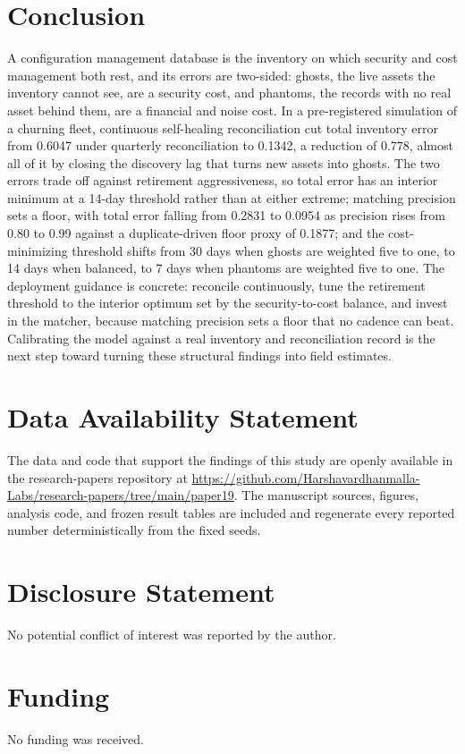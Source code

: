 \documentclass[journal]{IEEEtran}
\begin{document}
\section{Conclusion}
A configuration management database is the inventory on which security and cost management both rest,
and its errors are two-sided: ghosts, the live assets the inventory cannot see, are a security cost,
and phantoms, the records with no real asset behind them, are a financial and noise cost. In a
pre-registered simulation of a churning fleet, continuous self-healing reconciliation cut total
inventory error from 0.6047 under quarterly reconciliation to 0.1342, a reduction of 0.778, almost
all of it by closing the discovery lag that turns new assets into ghosts. The two errors trade off
against retirement aggressiveness, so total error has an interior minimum at a 14-day threshold rather
than at either extreme; matching precision sets a floor, with total error falling from 0.2831 to
0.0954 as precision rises from 0.80 to 0.99 against a duplicate-driven floor proxy of 0.1877; and the
cost-minimizing threshold shifts from 30 days when ghosts are weighted five to one, to 14 days when
balanced, to 7 days when phantoms are weighted five to one. The deployment guidance is concrete:
reconcile continuously, tune the retirement threshold to the interior optimum set by the
security-to-cost balance, and invest in the matcher, because matching precision sets a floor that no
cadence can beat. Calibrating the model against a real inventory and reconciliation record is the
next step toward turning these structural findings into field estimates.

\section*{Data Availability Statement}
The data and code that support the findings of this study are openly available in the research-papers repository at \url{https://github.com/Harshavardhanmalla-Labs/research-papers/tree/main/paper19}. The manuscript sources, figures, analysis code, and frozen result tables are included and regenerate every reported number deterministically from the fixed seeds.

\section*{Disclosure Statement}
No potential conflict of interest was reported by the author.

\section*{Funding}
No funding was received.
\end{document}
